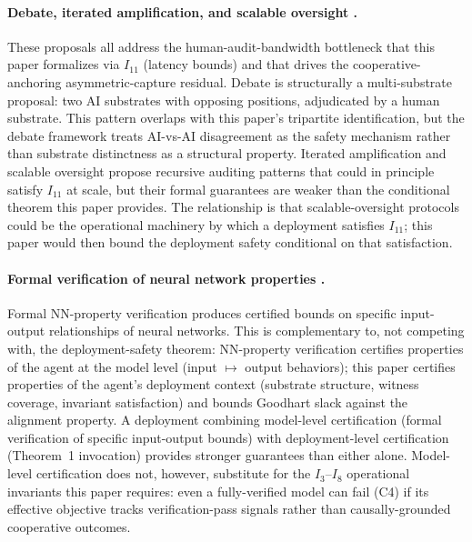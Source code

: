 \paragraph{Debate, iterated amplification, and scalable oversight
\citep{irving2018debate, christiano2018amplification, bowman2022scalable}.}
These proposals all address the human-audit-bandwidth bottleneck
that this paper formalizes via $I_{11}$ (latency bounds) and
that drives the cooperative-anchoring asymmetric-capture residual.
Debate is structurally a multi-substrate proposal: two AI
substrates with opposing positions, adjudicated by a human
substrate.  This pattern overlaps with this paper's tripartite
identification, but the debate framework treats AI-vs-AI
disagreement as the safety mechanism rather than substrate
distinctness as a structural property.  Iterated amplification
and scalable oversight propose recursive auditing patterns that
could in principle satisfy $I_{11}$ at scale, but their formal
guarantees are weaker than the conditional theorem this paper
provides.  The relationship is that scalable-oversight protocols
could be the operational machinery by which a deployment
satisfies $I_{11}$; this paper would then bound the deployment
safety conditional on that satisfaction.

\paragraph{Formal verification of neural network properties
\citep{katz2017reluplex, ehlers2017formal, wang2021beta}.}
Formal NN-property verification produces certified bounds on
specific input-output relationships of neural networks.  This is
complementary to, not competing with, the deployment-safety
theorem: NN-property verification certifies properties of the
agent at the model level (input $\mapsto$ output behaviors);
this paper certifies properties of the agent's deployment
context (substrate structure, witness coverage, invariant
satisfaction) and bounds Goodhart slack against the alignment
property.  A deployment combining model-level certification
(formal verification of specific input-output bounds) with
deployment-level certification (Theorem~1 invocation) provides
stronger guarantees than either alone.  Model-level
certification does not, however, substitute for the $I_3$--$I_8$
operational invariants this paper requires: even a fully-verified
model can fail (C4) if its effective objective tracks
verification-pass signals rather than causally-grounded
cooperative outcomes.

